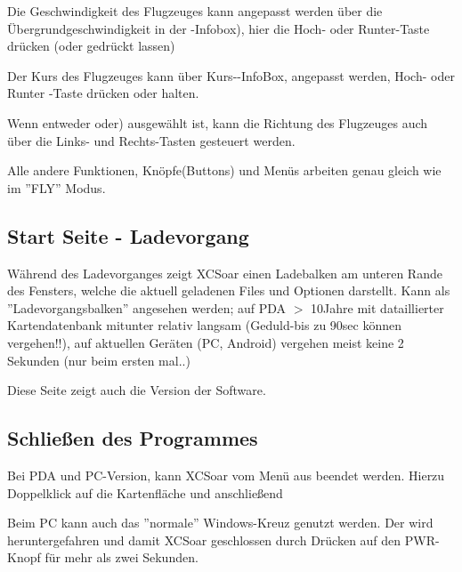 Die Geschwindigkeit des Flugzeuges kann angepasst werden über die Übergrundgeschwindigkeit in der -Infobox), hier die Hoch- oder Runter-Taste drücken (oder gedrückt lassen)

Der Kurs des Flugzeuges kann über Kurs--InfoBox, angepasst werden, Hoch- oder Runter -Taste drücken oder halten. 

Wenn entweder  oder) ausgewählt ist, 
kann die Richtung des Flugzeuges auch über die Links- und Rechts-Tasten gesteuert werden.

Alle andere Funktionen, Knöpfe(Buttons) und Menüs arbeiten genau gleich wie im ''FLY'' Modus. 


\subsection*{Start Seite - Ladevorgang}
Während des Ladevorganges zeigt {\textsf  XCSoar} einen Ladebalken am unteren Rande des Fensters, 
welche die aktuell geladenen Files und Optionen darstellt. Kann als ''Ladevorgangsbalken'' angesehen werden;  auf PDA $>$ 10Jahre mit dataillierter Kartendatenbank mitunter 
relativ langsam (Geduld-bis zu 90sec können vergehen!!), auf aktuellen Geräten (PC, Android) vergehen meist keine 2 Sekunden (nur beim ersten mal..) 

Diese Seite zeigt auch die Version der Software.

\subsection*{Schließen des Programmes}
Bei PDA und PC-Version, kann {\textsf  XCSoar} vom Menü aus beendet werden. Hierzu Doppelklick auf die Kartenfläche und anschließend 
\begin{quote}
\end{quote}

Beim PC kann auch das ''normale'' Windows-Kreuz genutzt werden.
Der \al wird heruntergefahren und damit {\textsf  XCSoar} geschlossen durch Drücken auf den PWR-Knopf für mehr als zwei Sekunden.
